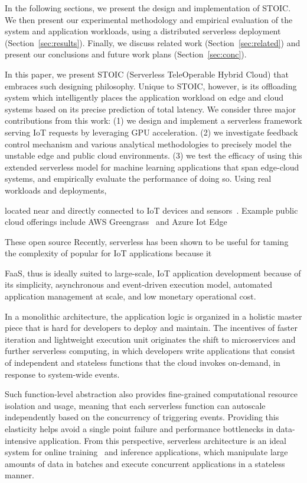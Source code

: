 In the following sections, we present the design and implementation of STOIC.
We then present our experimental methodology and empirical evaluation of the
system and application workloads, using a distributed serverless deployment
(Section~\ref{sec:results}). Finally, we discuss related work
(Section~\ref{sec:related}) and present our conclusions and future work plans
(Section~\ref{sec:conc}).

\iffalse
In this paper, we present STOIC (Serverless TeleOperable Hybrid Cloud) that embraces such designing philosophy. Unique to STOIC, however, is its offloading system which intelligently places the application workload on edge and cloud systems based on its precise prediction of total latency. We consider three major contributions from this work: (1) we design and implement a serverless framework serving IoT requests by leveraging GPU acceleration. (2) we investigate feedback control mechanism and various analytical methodologies to precisely model the unstable edge and public cloud environments. (3) we test the efficacy of using this extended serverless model for machine learning applications that span edge-cloud systems, and empirically evaluate the performance of doing so. Using real workloads and deployments, 

located near and directly
connected to IoT devices and
sensors~\cite{edge,bonomi2012fog,cloudlets,cloudlets2012satya,verbelen2012cloudlets}.
Example public cloud offerings include AWS Greengrass~\cite{greengrassweb,awsiot-web} and
Azure Iot Edge~\cite{iotedge-web,iothub-web}


These open source 
Recently, serverless has been shown to be useful for taming the
complexity of  popular for IoT applications because it 

FaaS, thus is ideally suited to large-scale, IoT application development because of its simplicity,
asynchronous and event-driven execution model, automated application management at scale,
and low monetary operational cost.

In a monolithic architecture, the application logic is organized in a holistic master piece that is hard for developers to deploy and maintain. The incentives of faster iteration and lightweight execution unit originates the shift to microservices and further serverless computing, in which developers write applications that consist of independent and stateless functions that the cloud invokes on-demand, in response to system-wide events.

Such function-level abstraction also provides fine-grained computational resource isolation and usage, meaning that each serverless function can autoscale independently based on the concurrency of triggering events. Providing this elasticity helps avoid a single point failure and performance bottlenecks in data-intensive application. From this perspective, serverless architecture is an ideal system for online training~\cite{ref:online} and inference applications, which manipulate large amounts of data in batches and execute concurrent applications in a stateless manner.

